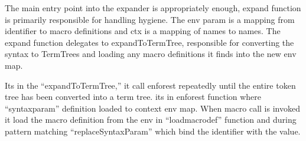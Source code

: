 The main entry point into the expander is appropriately enough,
expand function is primarily responsible for handling hygiene. The env param is a mapping from identifier to macro definitions and ctx is a mapping of names to names. The expand function delegates to expandToTermTree, responsible for converting the syntax to TermTrees and loading any macro definitions it finds into the new env map.

Its in the ``expandToTermTree,'' it call enforest repeatedly until the entire token tree has been converted into a term tree. its in enforest function where ``syntaxparam'' definition loaded to context env map. When macro call is invoked it load the macro definition from the env in ``loadmacrodef'' function and during pattern matching ``replaceSyntaxParam'' which bind the identifier with the value.

